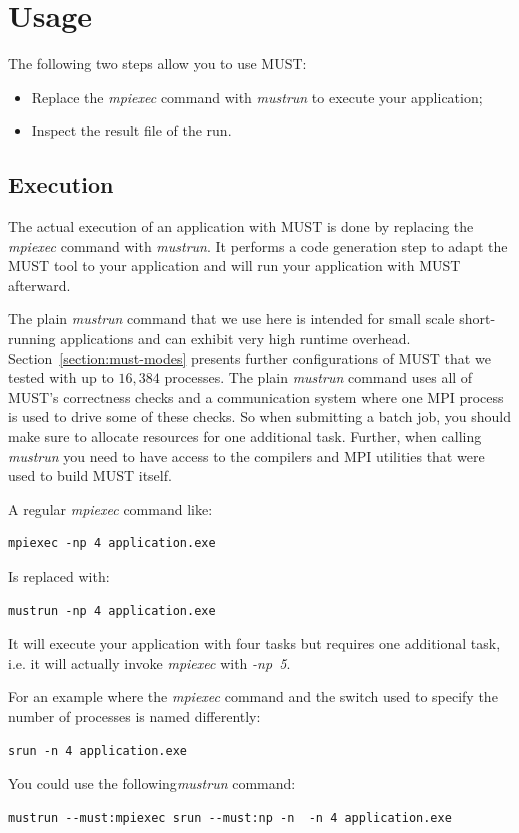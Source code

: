 \documentclass[english]{scrartcl}
\begin{document}
\section{Usage}

The following two steps allow you to use MUST:
\begin{itemize}
\item Replace the \emph{mpiexec} command with
\emph{mustrun} to execute your application;
\item Inspect the result file of the run.
\end{itemize}

\subsection{Execution}

The actual execution of an application with MUST is done by replacing the
\emph{mpiexec} command with \emph{mustrun}. It performs a code generation step
to adapt the MUST tool to your application and will run your application with MUST afterward. 

The plain \emph{mustrun} command that we use here is intended for small scale
short-running applications and can exhibit very high runtime overhead.
Section~\ref{section:must-modes} presents further configurations of MUST that
we tested with up to $16,384$ processes.  The plain \emph{mustrun} command uses
all of MUST's correctness checks and a communication system where one MPI 
process is used to drive some of these
checks. So when submitting a batch job,
you should make sure to allocate resources for one additional task. Further,
when calling \emph{mustrun} you need to have access to the compilers and MPI
utilities that were used to build MUST itself.

A regular \emph{mpiexec} command like:
\begin{verbatim}
mpiexec -np 4 application.exe
\end{verbatim}
Is replaced with:
\begin{verbatim}
mustrun -np 4 application.exe
\end{verbatim}
It will execute your application with four tasks but requires one additional task,
i.e. it will actually invoke \emph{mpiexec} with \emph{\mbox{-np 5}}.

For an example where the \emph{mpiexec} command and the switch used to
specify the number of processes is named differently:
\begin{verbatim}
srun -n 4 application.exe
\end{verbatim}
You could use the following\emph{mustrun} command:
\begin{verbatim}
mustrun --must:mpiexec srun --must:np -n  -n 4 application.exe
\end{verbatim}
\end{document}
